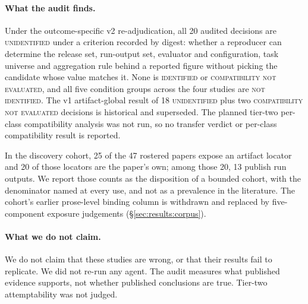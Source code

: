 \paragraph{What the audit finds.}
Under the outcome-specific v2 re-adjudication, all 20 audited decisions are
\textsc{unidentified} under a criterion recorded by digest: whether a reproducer can determine
the release set, run-output set, evaluator and configuration, task universe and aggregation
rule behind a reported figure without picking the candidate whose value matches it. None is
\textsc{identified} or \textsc{compatibility not evaluated}, and all five condition groups
across the four studies are \textsc{not identified}. The v1 artifact-global result of 18
\textsc{unidentified} plus two \textsc{compatibility not evaluated} decisions is historical
and superseded.
The planned tier-two per-class compatibility analysis was not run, so no transfer verdict or
per-class compatibility result is reported.

In the discovery cohort, 25 of the 47 rostered papers expose an artifact locator and 20 of
those locators are the paper's own; among those 20, 13 publish run outputs. We report those
counts as the disposition of a bounded cohort, with the denominator named at every use, and
not as a prevalence in the literature. The cohort's earlier prose-level binding column is
withdrawn and replaced by five-component exposure judgements
(\S\ref{sec:results:corpus}).

\paragraph{What we do not claim.}
We do not claim that these studies are wrong, or that their results fail to replicate. We
did not re-run any agent. The audit measures what published evidence supports, not whether
published conclusions are true. Tier-two attemptability was not judged.

